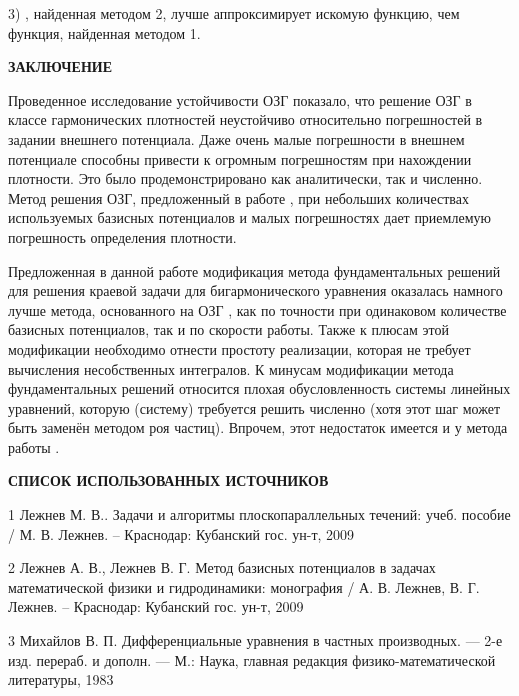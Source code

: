 \documentclass[a4paper]{article}
\begin{document}
  3) {, найденная методом 2, лучше аппроксимирует искомую функцию, чем функция, найденная методом 1}.

  \newpage
  \begin{center}
 {\bf ЗАКЛЮЧЕНИЕ } 
  \end{center}

  Проведенное исследование устойчивости ОЗГ показало, что  решение ОЗГ в классе гармонических плотностей неустойчиво относительно погрешностей в задании внешнего потенциала.  Даже очень малые погрешности в внешнем потенциале способны привести к огромным погрешностям при нахождении плотности.   Это было продемонстрировано как аналитически, так и численно. Метод решения ОЗГ, предложенный в работе \cite{lezh2}, при небольших количествах используемых базисных потенциалов и малых погрешностях  дает приемлемую погрешность определения плотности.										

  Предложенная в данной работе модификация метода фундаментальных решений для решения краевой задачи для бигармонического уравнения оказалась намного лучше метода, основанного на ОЗГ \cite{lezh2},  как по точности при одинаковом количестве базисных потенциалов, так и по скорости работы. Также к плюсам этой модификации необходимо отнести простоту реализации, которая не требует вычисления несобственных интегралов.  К минусам модификации метода фундаментальных решений относится плохая обусловленность системы линейных уравнений, которую (систему) требуется решить численно (хотя этот шаг может быть заменён методом роя частиц). Впрочем, этот недостаток имеется и у метода работы \cite{lezh2}.

\newpage

\begin{center}
  {\bf СПИСОК ИСПОЛЬЗОВАННЫХ ИСТОЧНИКОВ}
\end{center}

1 Лежнев М. В.. Задачи и алгоритмы плоскопараллельных течений: учеб. пособие / М. В. Лежнев. -- Краснодар: Кубанский гос. ун-т, 2009

2 Лежнев А. В.,  Лежнев В. Г. Метод базисных потенциалов в задачах математической физики и гидродинамики: монография / А. В. Лежнев, В. Г. Лежнев. -- Краснодар: Кубанский гос. ун-т, 2009

3 Михайлов В. П. Дифференциальные уравнения в частных производных. --- 2-е изд. перераб. и дополн. --- М.: Наука, главная редакция физико-математической литературы, 1983
\end{document}
